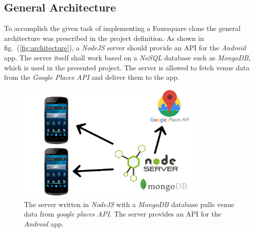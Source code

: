 \subsection{General Architecture}
\label{subsec:general_architecture}
To accomplish the given task of implementing a Foursquare clone the general architecture was prescribed in the project definition. As shown in fig.\ (\ref{fig:architecture}), a \textit{NodeJS} server should provide an API for the \textit{Android} app. The server itself shall work based on a \textit{NoSQL} database such as \textit{MongoDB}, which is used in the presented project. The server is allowed to fetch venue data from the \textit{Google Places API} and deliver them to the app. 

\begin{figure}[htbp]
	\includegraphics[width=0.8\textwidth]{images/architecture.png}
	\centering
	\caption[Project architecture]{The server written in \textit{NodeJS} with a \textit{MongoDB} database pulls venue data from \textit{google places API}. The server provides an API for the \textit{Android} app.\footnotemark}
	\label{fig:archtecture}
\end{figure} 


